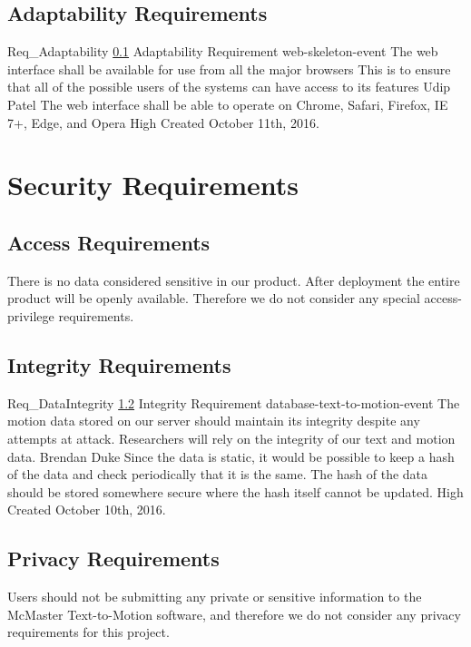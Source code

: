 \documentclass{scrreprt}
\begin{document}
\subsection{Adaptability Requirements}
\label{req-adaptability}

\requirement
{Req_Adaptability}
{\ref{req-adaptability} Adaptability Requirement}
{web-skeleton-event}
{The web interface shall be available for use from all the major browsers}
{This is to ensure that all of the possible users of the systems can have access to its features}
{Udip Patel}
{The web interface shall be able to operate on Chrome, Safari, Firefox, IE 7+, Edge, and Opera}
{High}
{Created October 11th, 2016.}


\section{Security Requirements}

\subsection{Access Requirements}

There is no data considered sensitive in our product. After deployment the
entire product will be openly available. Therefore we do not consider any
special access-privilege requirements.

\subsection{Integrity Requirements}
\label{req-integrity}

\requirement
{Req_DataIntegrity}
{\ref{req-integrity} Integrity Requirement}
{database-text-to-motion-event}
{The motion data stored on our server should maintain its integrity despite any
attempts at attack.}
{Researchers will rely on the integrity of our text and motion data.}
{Brendan Duke}
{Since the data is static, it would be possible to keep a hash of the data and
check periodically that it is the same. The hash of the data should be stored
somewhere secure where the hash itself cannot be updated.}
{High}
{Created October 10th, 2016.}

\subsection{Privacy Requirements}

Users should not be submitting any private or sensitive information to the
McMaster Text-to-Motion software, and therefore we do not consider any privacy
requirements for this project.
\end{document}
